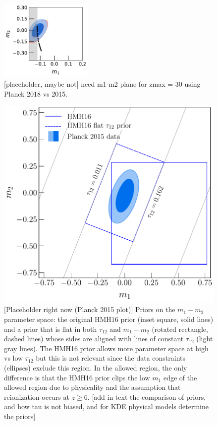 \documentclass[prd,twocolumn,amsmath,amssymb,floatfix,superscriptaddress,nofootinbib]{revtex4-1}
\begin{document}
\begin{figure}
\includegraphics[width=0.4\textwidth]{results/pc_results/plot_m1_m2_pl18_pc_zmax30_pliklite_srollv2_vs_pl18_pc_zmax30_pliklite_wTauTrajectory.pdf}
\caption{[placeholder, maybe not] need m1-m2 plane for zmax = 30 using Planck 2018 vs 2015.
}
\label{fig:plot_m1m2}
\end{figure}

 
 \begin{figure}
          \includegraphics[width=0.9\columnwidth]{paper/plots/plot_rotated_box_flat_tau_prior_fac_0p8.pdf}
          \caption
          {[Placeholder right now (Planck 2015 plot)] Priors on the $m_1-m_2$ parameter space: the original HMH16 prior (inset square, solid lines) and a prior that is flat in
          both $\tau_{12}$ and $m_1-m_2$ (rotated rectangle, dashed lines) whose sides are aligned with lines of
          constant $\tau_{12}$ (light gray lines).   The HMH16 prior allows more parameter space at high vs low $\tau_{12}$ but this
          is not relevant since the data constraints (ellipses) exclude this region.  In the allowed region, the only difference is that the HMH16 prior clips the low $m_1$ edge of the allowed region due to physicality and the assumption that reionization occurs at
          $z\ge 6$. [add in text the comparison of priors, and how tau is not biased, and for KDE physical models determine the priors]}  \label{fig:prior_box}
\end{figure}
\end{document}
